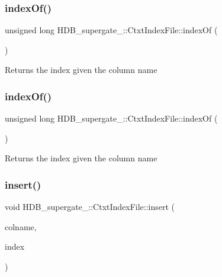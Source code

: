 \subsubsection{\texorpdfstring{index\+Of()}{indexOf()}\hspace{0.1cm}{\footnotesize\ttfamily [1/2]}}
{\footnotesize\ttfamily unsigned long H\+D\+B\+\_\+supergate\+\_\+\+::\+Ctxt\+Index\+File\+::index\+Of (\begin{DoxyParamCaption}\item[{std\+::string}]{ }\end{DoxyParamCaption})}

Returns the index given the column name \mbox{\label{classHDB__supergate___1_1CtxtIndexFile_abbc89b8e64ca3bcfe104c2371336bd9f}} 
\subsubsection{\texorpdfstring{index\+Of()}{indexOf()}\hspace{0.1cm}{\footnotesize\ttfamily [2/2]}}
{\footnotesize\ttfamily unsigned long H\+D\+B\+\_\+supergate\+\_\+\+::\+Ctxt\+Index\+File\+::index\+Of (\begin{DoxyParamCaption}\item[{std\+::string}]{ }\end{DoxyParamCaption})}

Returns the index given the column name \mbox{\label{classHDB__supergate___1_1CtxtIndexFile_ab581d8e3c893b29a80b18413b1c45412}} 
\subsubsection{\texorpdfstring{insert()}{insert()}\hspace{0.1cm}{\footnotesize\ttfamily [1/2]}}
{\footnotesize\ttfamily void H\+D\+B\+\_\+supergate\+\_\+\+::\+Ctxt\+Index\+File\+::insert (\begin{DoxyParamCaption}\item[{std\+::string}]{colname,  }\item[{\hyperlink{classHDB__supergate___1_1CtxtIndex}{Ctxt\+Index} \&}]{index }\end{DoxyParamCaption})}

